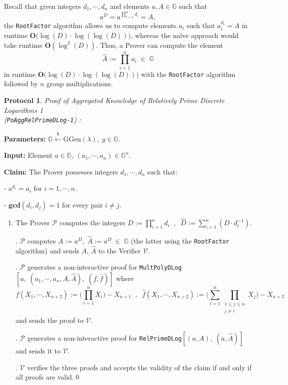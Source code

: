 \documentclass[11pt, lettersize, notitlepage, leqno, footskip=0.6cm]{article}
\newcommand{\pl}{\prod\limits}
\newcommand{\slim}{\sum\limits}
\newcommand{\bG}{\mathbb{G}}
\newcommand{\mc}{\mathcal}
\newcommand{\mb}{\mathbb}
\newcommand{\mbf}{\mathbf}
\newcommand{\mr}{\mathrm}
\newcommand{\lamb}{\lambda}
\newcommand{\what}{\widehat}
\newcommand{\mP}{\mc{P}}
\newcommand{\V}{\mc{V}}
\newcommand{\vs}{\vspace{-0.15cm}}
\newcommand{\noin}{\noindent}
\newcommand{\GCD}{\mbf{gcd}}
\newtheorem{Prot}[Thm]{Protocol}
\numberwithin{equation}{section}
\begin{document}
\noin Recall that given integers $d_1,\cdots,d_n$ and elements $a,A\in\mb{G}$ such that \vs $$a^D = a^{\pl_{i=1}^n d_i} = A ,$$ the {\tt{RootFactor}} algorithm allows us to compute elements $a_i$ such that $a_i^{d_i} = A$ in runtime $\mbf{O}\big(\log(D) \cdot \log(\log(D))\big)$, whereas the na\"ive approach would take runtime $\mbf{O}(\log^2(D))$. Thus, a Prover can compute the element \vs $$\what{A}:= \pl_{i=1}^n a_i\;\in\;\bG$$ in runtime $\mbf{O}\big(\log(D) \cdot \log(\log(D))\big)$ with the {\tt{RootFactor}} algorithm followed by $n$ group multiplications.

\vspace{0.2cm}

\begin{Prot} \normalfont \hypertarget{RP1}{\textit{Proof of Aggregated Knowledge of Relatively Prime Discrete Logarithms} 1} \\(\verb|PoAggRelPrimeDLog-1|) :\end{Prot} \vspace{-0.3cm}

\noindent \textbf{Parameters:} $\mb{G}\xleftarrow{\$} \mr{GGen}(\lamb), \; g\in \mb{G}$.

\noindent \textbf{Input:} Element $a\in\mb{G}$, $(a_1,\cdots,a_n)\in \mb{G}^n$.

\noindent \textbf{Claim:} The Prover possesses integers $d_1,\cdots, d_n$ such that:

\noindent - $a^{d_i} = a_i$ for $i = 1,\cdots, n$.

\noindent - $\GCD(d_i, d_j) = 1$ for every pair $i\neq j$.


\begin{enumerate}[wide, labelwidth=!, labelindent=0pt]\vs \item The Prover $\mP$ computes the integers $D:=\prod_{i=1}^n d_i\;\;,\;\; \what{D}:= \sum_{i=1}^n (D\cdot d_i^{-1}).$

\noin 2. $\mP$ computes $A:= a^D,\;\what{A}:= a^{\what{D}}\;\in\;\bG $ (the latter using the {\tt{RootFactor}} algorithm) and sends $A$, $\what{A}$ to the Verifier $\V$.

\begin{comment}
\noin 3. $\mP$ generates a non-interactive proof for \verb|AggKE-1|$[a,\;(a_1,\cdots,a_n)]$ and sends it to $\V$.

\noin 4. \end{comment}


\noin 3. $\mP$ generates a non-interactive proof for \verb|MultPolyDLog|$[a,\;(a_1,\cdots,a_n,A, \what{A}),\; (f,\what{f})]$ where \vs $$f(X_1,\cdots,X_{n+2}):= \big(\pl_{i=1}^n X_i\big) -X_{n+1}\;\;,\;\;\what{f}(X_1,\cdots, X_{n+2}):= \big(\slim_{i=1}^n \pl_{\substack{1\leq j\leq n \\ j\neq i}} X_j\big) - X_{n+2}$$ and sends the proof to $\V$.

\noin 4. $\mP$ generates a non-interactive proof for \verb|RelPrimeDLog|$[(a,A),\;(a,\what{A})]$ and sends it to $\V$.

\noin 5. $\V$ verifies the three proofs and accepts the validity of the claim if and only if all proofs are valid.\qed \end{enumerate}
\end{document}
